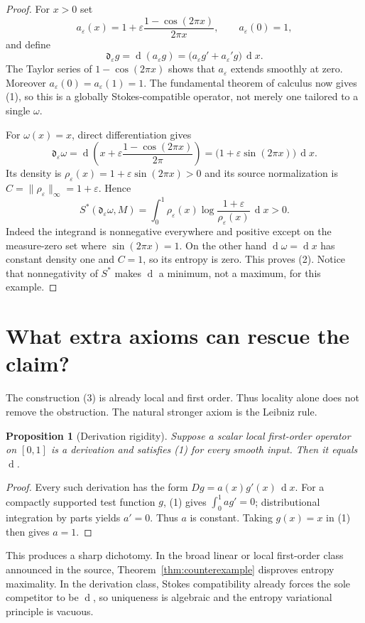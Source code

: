 \documentclass[11pt]{article}
\newtheorem{proposition}{Proposition}
\newcommand{\dd}{\mathop{\mathrm d}}
\newcommand{\De}{\mathfrak d_\varepsilon}
\begin{document}
\begin{proof}
For $x>0$ set
\[
 a_\varepsilon(x)=1+\varepsilon
 \frac{1-\cos(2\pi x)}{2\pi x},
 \qquad a_\varepsilon(0)=1,
\]
and define
\[
 \De g=\dd(a_\varepsilon g)
 =\bigl(a_\varepsilon g'+a_\varepsilon'g\bigr)\,\dd x. \tag{3}
\]
The Taylor series of $1-\cos(2\pi x)$ shows that $a_\varepsilon$ extends
smoothly at zero.  Moreover
$a_\varepsilon(0)=a_\varepsilon(1)=1$.  The fundamental theorem of calculus
now gives (1), so this is a globally Stokes-compatible operator, not merely
one tailored to a single $\omega$.

For $\omega(x)=x$, direct differentiation gives
\[
 \De\omega
 =\dd\!\left(x+\varepsilon\frac{1-\cos(2\pi x)}{2\pi}\right)
 =\bigl(1+\varepsilon\sin(2\pi x)\bigr)\,\dd x. \tag{4}
\]
Its density is
$\rho_\varepsilon(x)=1+\varepsilon\sin(2\pi x)>0$ and its source
normalization is $C=\|\rho_\varepsilon\|_\infty=1+\varepsilon$.  Hence
\[
 S^*(\De\omega,M)=
 \int_0^1\rho_\varepsilon(x)
 \log\frac{1+\varepsilon}{\rho_\varepsilon(x)}\,\dd x>0. \tag{5}
\]
Indeed the integrand is nonnegative everywhere and positive except on the
measure-zero set where $\sin(2\pi x)=1$.  On the other hand
$\dd\omega=\dd x$ has constant density one and $C=1$, so its entropy is
zero.  This proves (2).  Notice that nonnegativity of $S^*$ makes $\dd$ a
minimum, not a maximum, for this example.
\end{proof}

\section*{What extra axioms can rescue the claim?}
The construction (3) is already local and first order.  Thus locality alone
does not remove the obstruction.  The natural stronger axiom is the Leibniz
rule.

\begin{proposition}[Derivation rigidity]
Suppose a scalar local first-order operator on $[0,1]$ is a derivation and
satisfies (1) for every smooth input.  Then it equals $\dd$.
\end{proposition}

\begin{proof}
Every such derivation has the form $Dg=a(x)g'(x)\,\dd x$.  For a compactly
supported test function $g$, (1) gives $\int_0^1a g'=0$; distributional
integration by parts yields $a'=0$.  Thus $a$ is constant.  Taking $g(x)=x$
in (1) then gives $a=1$.
\end{proof}

This produces a sharp dichotomy.  In the broad linear or local first-order
class announced in the source, Theorem~\ref{thm:counterexample} disproves
entropy maximality.  In the derivation class, Stokes compatibility already
forces the sole competitor to be $\dd$, so uniqueness is algebraic and the
entropy variational principle is vacuous.
\end{document}
